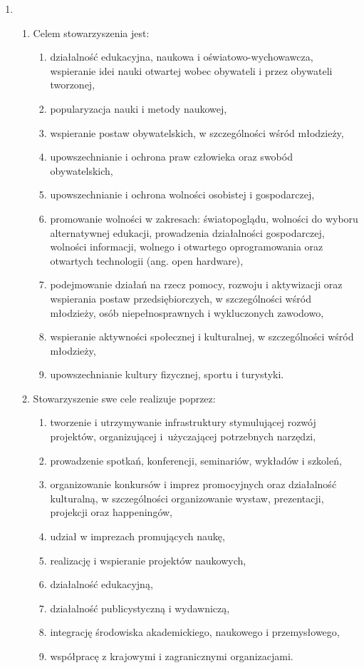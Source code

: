 \documentclass[chapterprefix,notitlepage]{article}
\begin{document}
\begin{enumerate}
	\item \begin{enumerate}
		\item Celem stowarzyszenia jest:
		\begin{enumerate}
			\item działalność edukacyjna, naukowa i oświatowo-wychowawcza, wspieranie idei nauki otwartej wobec obywateli i przez obywateli tworzonej,
			\item popularyzacja nauki i metody naukowej,
			\item wspieranie postaw obywatelskich, w szczególności wśród młodzieży,
			\item upowszechnianie i ochrona praw człowieka oraz swobód obywatelskich,
			\item upowszechnianie i ochrona wolności osobistej i gospodarczej,
			\item promowanie wolności w zakresach: światopoglądu, wolności do wyboru alternatywnej edukacji, prowadzenia działalności gospodarczej, wolności informacji, wolnego i otwartego oprogramowania oraz otwartych technologii (ang. open hardware),
			\item podejmowanie działań na rzecz pomocy, rozwoju i aktywizacji oraz wspierania postaw przedsiębiorczych, w szczególności wśród młodzieży, osób niepełnosprawnych i wykluczonych zawodowo,
			\item wspieranie aktywności społecznej i kulturalnej, w szczególności wśród młodzieży,
			\item upowszechnianie kultury fizycznej, sportu i turystyki.
		\end{enumerate}
		\item Stowarzyszenie swe cele realizuje poprzez:
		\begin{enumerate}
			\item tworzenie i utrzymywanie infrastruktury stymulującej rozwój projektów, organizującej i~użyczającej potrzebnych narzędzi,
			\item prowadzenie spotkań, konferencji, seminariów, wykładów i szkoleń,
			\item organizowanie konkursów i imprez promocyjnych oraz działalność kulturalną, w szczególności organizowanie wystaw, prezentacji, projekcji oraz happeningów,
			\item udział w imprezach promujących naukę,
			\item realizację i wspieranie projektów naukowych,
			\item działalność edukacyjną,
			\item działalność publicystyczną i wydawniczą,
			\item integrację środowiska akademickiego, naukowego i przemysłowego,
			\item współpracę z krajowymi i zagranicznymi organizacjami.
		\end{enumerate}
	\end{enumerate}
	

\end{enumerate}
\end{document}
